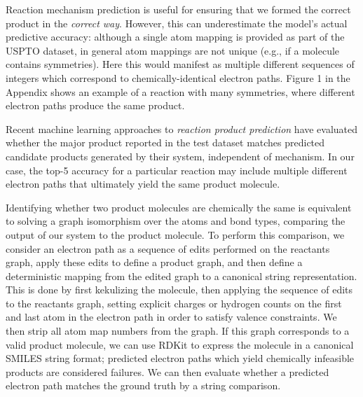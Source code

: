 Reaction mechanism prediction is useful for ensuring that we formed the correct product in the {\em correct way}.
However, this can underestimate the model's actual predictive accuracy: 
although a single atom mapping is provided as part of the USPTO dataset, in general atom mappings are not unique (e.g., if a molecule contains symmetries). 
Here this would manifest as multiple different sequences of integers which correspond to chemically-identical electron paths. 
Figure 1 in the Appendix shows an example of a reaction with many symmetries, where different electron paths produce the same product. %

Recent machine learning approaches to {\em reaction product prediction} \citep{jin2017predicting,schwaller2017found}
have evaluated whether the major product reported in the test dataset matches predicted candidate products generated by their system, independent of mechanism.
In our case, the top-5 accuracy for a particular reaction may include multiple different electron paths that ultimately yield the same product molecule.

Identifying whether two product molecules are chemically the same is equivalent to solving a graph isomorphism over the atoms and bond types, comparing the output of our system to the product molecule.
To perform this comparison, we consider an electron path as a sequence of edits performed on the reactants graph, apply these edits to define a product graph, 
and then define a deterministic mapping from the edited graph to a canonical string representation.
This is done by first kekulizing the molecule, %
then applying the sequence of edits to the reactants graph,
setting explicit charges or hydrogen counts on the first and last atom in the electron path in order to satisfy valence constraints.
We then strip all atom map numbers from the graph.
If this graph corresponds to a valid product molecule, we can use RDKit to express the molecule in a canonical SMILES string format;
predicted electron paths which yield chemically infeasible products are considered failures.
We can then evaluate whether a predicted electron path matches the ground truth by a string comparison.

